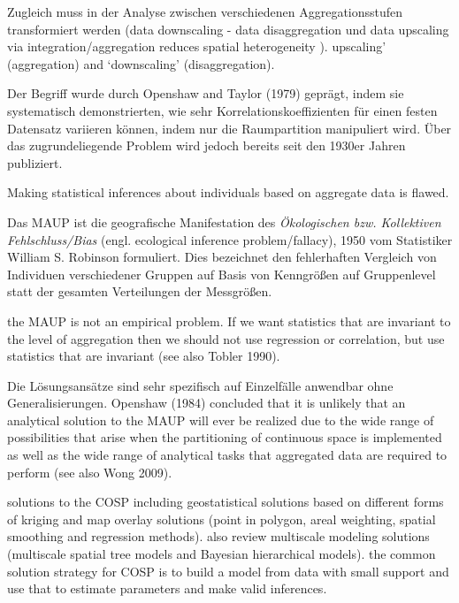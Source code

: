Zugleich muss in der Analyse zwischen verschiedenen Aggregationsstufen transformiert werden 
(data downscaling - data disaggregation und data upscaling via integration/aggregation reduces spatial heterogeneity ).
upscaling’ (aggregation) and ‘downscaling’ (disaggregation).

Der Begriff wurde durch Openshaw and Taylor (1979) geprägt, indem sie systematisch demonstrierten, 
wie sehr Korrelationskoeffizienten für einen festen Datensatz variieren können, indem nur die Raumpartition manipuliert wird.
Über das zugrundeliegende Problem wird jedoch bereits seit den 1930er Jahren publiziert.


Making statistical inferences about individuals based on aggregate data is flawed.

Das MAUP ist die geografische Manifestation des \emph{Ökologischen bzw. Kollektiven Fehlschluss/Bias} (engl. ecological inference problem/fallacy), 
1950 vom Statistiker William S. Robinson formuliert. 
Dies bezeichnet den fehlerhaften Vergleich von Individuen verschiedener Gruppen auf Basis von Kenngrößen auf Gruppenlevel statt der gesamten Verteilungen der Messgrößen.

the MAUP is not an empirical problem. If we want statistics that are invariant to the level of aggregation then we should not use regression or correlation, but use
statistics that are invariant (see also Tobler 1990).

Die Lösungsansätze sind sehr spezifisch auf Einzelfälle anwendbar ohne Generalisierungen. 
Openshaw (1984) concluded that it is unlikely that an analytical solution to the MAUP will ever be realized due to the wide range of possibilities 
that arise when the partitioning of continuous space is implemented as well as the wide range of analytical tasks that aggregated data are required to perform (see also Wong 2009). 

solutions to the COSP including geostatistical solutions based on different forms of kriging and map overlay solutions (point in polygon, areal weighting, spatial smoothing and regression methods).
also review multiscale modeling solutions (multiscale spatial tree models and Bayesian hierarchical models).
the common solution strategy for COSP is to build a model from data with small support and use that to estimate parameters and make valid inferences.


